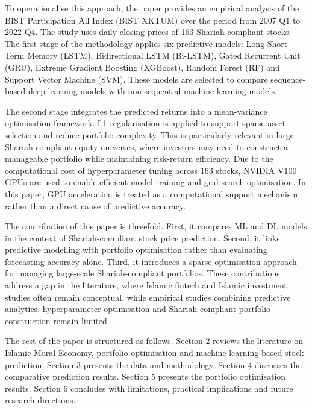 To operationalise this approach, the paper provides an empirical analysis of the BIST Participation All Index (BIST XKTUM) over the period from 2007 Q1 to 2022 Q4. The study uses daily closing prices of 163 Shariah-compliant stocks. The first stage of the methodology applies six predictive models: Long Short-Term Memory (LSTM), Bidirectional LSTM (Bi-LSTM), Gated Recurrent Unit (GRU), Extreme Gradient Boosting (XGBoost), Random Forest (RF) and Support Vector Machine (SVM). These models are selected to compare sequence-based deep learning models with non-sequential machine learning models.

The second stage integrates the predicted returns into a mean-variance optimisation framework. L1 regularisation is applied to support sparse asset selection and reduce portfolio complexity. This is particularly relevant in large Shariah-compliant equity universes, where investors may need to construct a manageable portfolio while maintaining risk-return efficiency. Due to the computational cost of hyperparameter tuning across 163 stocks, NVIDIA V100 GPUs are used to enable efficient model training and grid-search optimisation. In this paper, GPU acceleration is treated as a computational support mechanism rather than a direct cause of predictive accuracy.

The contribution of this paper is threefold. First, it compares ML and DL models in the context of Shariah-compliant stock price prediction. Second, it links predictive modelling with portfolio optimisation rather than evaluating forecasting accuracy alone. Third, it introduces a sparse optimisation approach for managing large-scale Shariah-compliant portfolios. These contributions address a gap in the literature, where Islamic fintech and Islamic investment studies often remain conceptual, while empirical studies combining predictive analytics, hyperparameter optimisation and Shariah-compliant portfolio construction remain limited.

The rest of the paper is structured as follows. Section 2 reviews the literature on Islamic Moral Economy, portfolio optimisation and machine learning-based stock prediction. Section 3 presents the data and methodology. Section 4 discusses the comparative prediction results. Section 5 presents the portfolio optimisation results. Section 6 concludes with limitations, practical implications and future research directions.